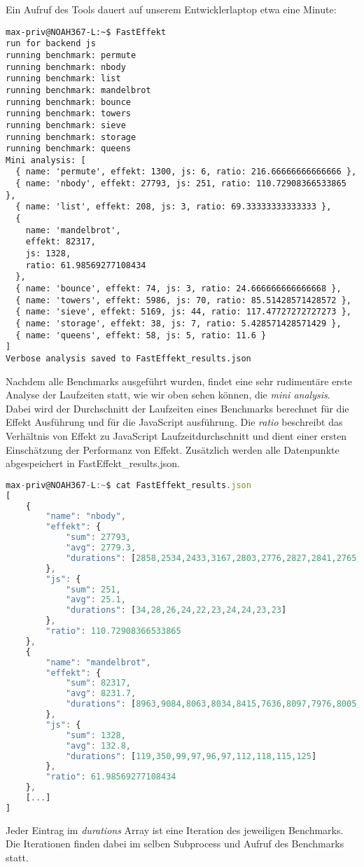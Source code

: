 Ein Aufruf des Tools dauert auf unserem Entwicklerlaptop etwa eine Minute:
\begin{lstlisting}
max-priv@NOAH367-L:~$ FastEffekt
run for backend js
running benchmark: permute
running benchmark: nbody
running benchmark: list
running benchmark: mandelbrot
running benchmark: bounce
running benchmark: towers
running benchmark: sieve
running benchmark: storage
running benchmark: queens
Mini analysis: [
  { name: 'permute', effekt: 1300, js: 6, ratio: 216.66666666666666 },
  { name: 'nbody', effekt: 27793, js: 251, ratio: 110.72908366533865 },
  { name: 'list', effekt: 208, js: 3, ratio: 69.33333333333333 },
  {
    name: 'mandelbrot',
    effekt: 82317,
    js: 1328,
    ratio: 61.98569277108434
  },
  { name: 'bounce', effekt: 74, js: 3, ratio: 24.666666666666668 },
  { name: 'towers', effekt: 5986, js: 70, ratio: 85.51428571428572 },
  { name: 'sieve', effekt: 5169, js: 44, ratio: 117.47727272727273 },
  { name: 'storage', effekt: 38, js: 7, ratio: 5.428571428571429 },
  { name: 'queens', effekt: 58, js: 5, ratio: 11.6 }
]
Verbose analysis saved to FastEffekt_results.json
\end{lstlisting}

Nachdem alle Benchmarks ausgeführt wurden, findet eine sehr rudimentäre erste Analyse der Laufzeiten statt, wie wir oben sehen können, die \textit{mini analysis}. Dabei wird der Durchschnitt der Laufzeiten eines Benchmarks berechnet für die Effekt Ausführung und für die JavaScript ausführung.
Die \textit{ratio} beschreibt das Verhältnis von Effekt zu JavaScript Laufzeitdurchschnitt und dient einer ersten Einschätzung der Performanz von Effekt.
Zusätzlich werden alle Datenpunkte abgespeichert in FastEffekt\_results.json.

\begin{lstlisting}[language=javascript]
max-priv@NOAH367-L:~$ cat FastEffekt_results.json 
[
    {
        "name": "nbody",
        "effekt": {
            "sum": 27793,
            "avg": 2779.3,
            "durations": [2858,2534,2433,3167,2803,2776,2827,2841,2765,2789]
        },
        "js": {
            "sum": 251,
            "avg": 25.1,
            "durations": [34,28,26,24,22,23,24,24,23,23]
        },
        "ratio": 110.72908366533865
    },
    {
        "name": "mandelbrot",
        "effekt": {
            "sum": 82317,
            "avg": 8231.7,
            "durations": [8963,9084,8063,8034,8415,7636,8097,7976,8005,8044]
        },
        "js": {
            "sum": 1328,
            "avg": 132.8,
            "durations": [119,350,99,97,96,97,112,118,115,125]
        },
        "ratio": 61.98569277108434
    },
    [...]
]
\end{lstlisting}
Jeder Eintrag im \textit{durations} Array ist eine Iteration des jeweiligen Benchmarks. Die Iterationen finden dabei im selben Subprocess und Aufruf des Benchmarks statt.

